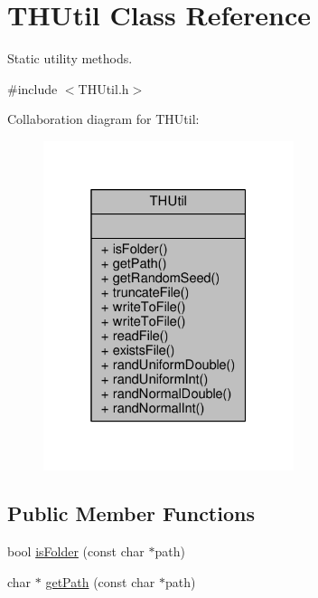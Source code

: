 \hypertarget{classTHUtil}{}\section{T\+H\+Util Class Reference}
\label{classTHUtil}


Static utility methods.  




{\ttfamily \#include $<$T\+H\+Util.\+h$>$}



Collaboration diagram for T\+H\+Util\+:\nopagebreak
\begin{figure}[H]
\begin{center}
\leavevmode
\includegraphics[width=208pt]{classTHUtil__coll__graph}
\end{center}
\end{figure}
\subsection*{Public Member Functions}
\begin{DoxyCompactItemize}
\item 
bool \hyperlink{classTHUtil_ac405438e0d0867945b98b32226c2a5eb}{is\+Folder} (const char $\ast$path)
\item 
char $\ast$ \hyperlink{classTHUtil_a5d4a93f3529c11ee522743dba7ac4bca}{get\+Path} (const char $\ast$path)
\end{DoxyCompactItemize}
